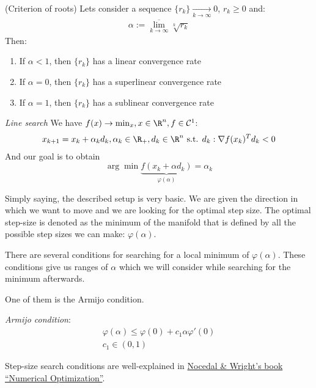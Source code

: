 \begin{theorem} (Criterion of roots) Lets consider a sequence $\{r_k\} \xrightarrow[k \to \infty]{} 0$, $r_k \geqslant 0$ and:
\begin{gather*}
  \alpha := \overline{\lim_{k \to \infty}} \sqrt[k]{r_k}
\end{gather*}
Then: 
\begin{enumerate}
  \item If $\alpha < 1$, then $\{r_k\}$ has a linear convergence rate
  \item If $\alpha = 0$, then $\{r_k\}$ has a superlinear convergence rate
  \item If $\alpha = 1$, then $\{r_k\}$ has a sublinear convergence rate
\end{enumerate}
\end{theorem}

\begin{definition} \textit{Line search} We have $f(x) \to \min_{x}, x \in \R^n, f \in \mathcal{C}^1$:
\begin{gather*}
  x_{k+1} = x_k + \alpha_k d_k, \alpha_k \in \R_+, d_k \in \R^n \text{ s.t. } d_k: \nabla f(x_k)^T d_k < 0
\end{gather*}
And our goal is to obtain 
$$
  \arg \min \underbrace{f(x_k + \alpha d_k)}_{\varphi(\alpha)} = \alpha_k
$$
\end{definition}

Simply saying, the described setup is very basic. We are given the direction in which we want to move and we are looking for the optimal step size. The optimal step-size is denoted as the minimum of the manifold that is defined by all the possible step sizes we can make: $\varphi(\alpha)$.

There are several conditions for searching for a local minimum of $\varphi(\alpha)$. These conditions give us ranges of $\alpha$ which we will consider while searching for the minimum afterwards.

One of them is the Armijo condition. 
\begin{definition} \textit{Armijo condition}:
\begin{gather*}
  \varphi(\alpha) \leqslant \varphi(0) + c_1 \alpha \varphi'(0) \\
  c_1 \in (0, 1)
\end{gather*}
\end{definition}

Step-size search conditions are well-explained in \href{https://www.math.uci.edu/~qnie/Publications/NumericalOptimization.pdf}{Nocedal \& Wright's book ``Numerical Optimization''}.

